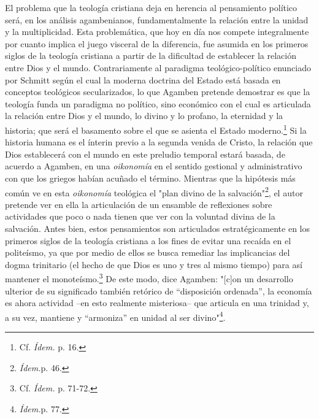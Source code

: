 El problema que la teología cristiana deja en herencia al pensamiento
político será, en los análisis agambenianos, fundamentalmente la
relación entre la unidad y la multiplicidad. Esta problemática, que hoy
en día nos compete integralmente por cuanto implica el juego visceral de
la diferencia, fue asumida en los primeros siglos de la teología
cristiana a partir de la dificultad de establecer la relación entre Dios
y el mundo. Contrariamente al paradigma teológico-político enunciado por
Schmitt según el cual la moderna doctrina del Estado está basada en
conceptos teológicos secularizados, lo que Agamben pretende demostrar es
que la teología funda un paradigma no político, sino económico con el
cual es articulada la relación entre Dios y el mundo, lo divino y lo
profano, la eternidad y la historia; que será el basamento sobre el que
se asienta el Estado moderno.\footnote{Cf. \emph{Ídem.} p. 16.} Si la
historia humana es el ínterin previo a la segunda venida de Cristo, la
relación que Dios establecerá con el mundo en este preludio temporal
estará basada, de acuerdo a Agamben, en una \emph{oikonomía} en el
sentido gestional y administrativo con que los griegos habían acuñado el
término. Mientras que la hipótesis más común ve en esta \emph{oikonomía}
teológica el "plan divino de la salvación"\footnote{\emph{Ídem.}p. 46.},
el autor pretende ver en ella la articulación de un ensamble de
reflexiones sobre actividades que poco o nada tienen que ver con la
voluntad divina de la salvación. Antes bien, estos pensamientos son
articulados estratégicamente en los primeros siglos de la teología
cristiana a los fines de evitar una recaída en el politeísmo, ya que por
medio de ellos se busca remediar las implicancias del dogma trinitario
(el hecho de que Dios es uno y tres al mismo tiempo) para así mantener
el monoteísmo.\footnote{Cf. \emph{Ídem.} p. 71-72.} De este modo, dice
Agamben: "{[}c{]}on un desarrollo ulterior de su significado también
retórico de ``disposición ordenada'', la economía es ahora actividad
--en esto realmente misteriosa-- que articula en una trinidad y, a su
vez, mantiene y ``armoniza'' en unidad al ser divino"\footnote{\emph{Ídem.}p.
  77.}.

